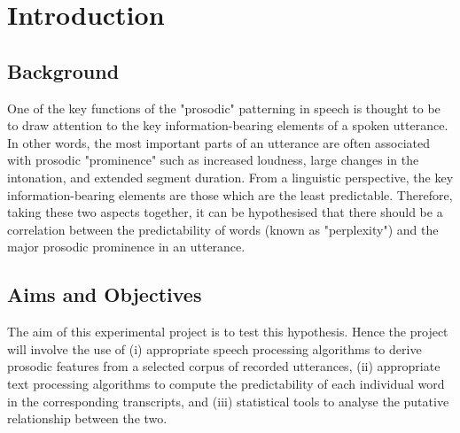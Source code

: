 \chapter{Introduction}

%
%
%
%
%
%

\section{Background}
 One of the key functions of the "prosodic" patterning in speech is thought to be to draw attention to the key information-bearing elements of a spoken utterance. In other words, the most important parts of an utterance are often associated with prosodic "prominence" such as increased loudness, large changes in the intonation, and extended segment duration. From a linguistic perspective, the key information-bearing elements are those which are the least predictable. Therefore, taking these two aspects together, it can be hypothesised that there should be a correlation between the predictability of words (known as "perplexity") and the major prosodic prominence in an utterance.

\section{Aims and Objectives}

The aim of this experimental project is to test this hypothesis. Hence the project will involve the use of (i) appropriate speech processing algorithms to derive prosodic features from a selected corpus of recorded utterances, (ii) appropriate text processing algorithms to compute the predictability of each individual word in the corresponding transcripts, and (iii) statistical tools to analyse the putative relationship between the two.


